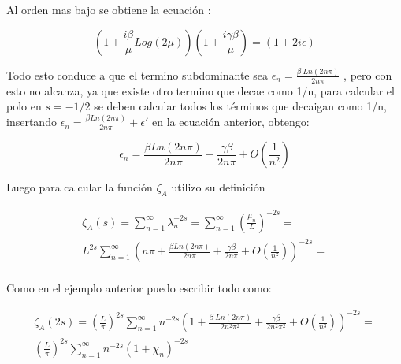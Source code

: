 Al orden mas bajo se obtiene la ecuación : 

\begin{equation}
(1 + \frac{i \beta}{ \mu} Log( 2 \mu) ) 
(1 + \frac{i  \gamma \beta}{ \mu})  =
(1 + 2 i \epsilon)
\end{equation}

Todo esto conduce a que el termino subdominante sea $\epsilon _n =  \frac{\beta \ Ln(2 n \pi)}{2 n \pi}$ , pero con esto no alcanza, ya que existe otro termino que decae como 1/n, para calcular el polo en $s=-1/2$ se deben calcular todos los términos que decaigan como 1/n, insertando $\epsilon _n =  \frac{\beta Ln(2 n \pi)}{2 n \pi} + \epsilon '$ en la ecuación anterior, obtengo:


\begin{equation}
    \epsilon _n =  \frac{\beta Ln(2 n \pi)}{2 n \pi} +
                \frac{\gamma \beta}{2 n \pi} +
                O(\frac{1}{n^2})
\end{equation}

Luego para calcular la función $\zeta _{A}$ utilizo su definición

\begin{equation}
\begin{array}{c}
    \zeta _A (s) = \sum _{n=1} ^{\infty} \lambda _n ^{-2 s}  =
    \sum _{n=1} ^{\infty} \left(\frac{\mu _n}{L} \right) ^{-2 s} =  \\
    L ^{2 s} \sum _{n=1} ^{\infty} 
    \left( 
    n \pi + \frac{\beta Ln(2 n \pi)}{2 n \pi} + \frac{\gamma \beta}{2 n \pi} +
    O(\frac{1}{n^2})
    \right) ^{-2s} = \\
    
\end{array}
\end{equation}

Como en el ejemplo anterior puedo escribir todo como:

\begin{equation}
\begin{array}{c}
    \zeta _A (2 s) = \left( \frac{L}{\pi} \right)  ^{2 s} 
    \sum _{n=1} ^{\infty} n ^{- 2  s}
    \left(
    1 + \frac{\beta \ Ln(2 n \pi)}{2 n^2 \pi ^2} + \frac{\gamma \beta}{2 n^2 \pi ^2 } +
    O \left( \frac{1}{n^3} \right)  \right) ^{-2 s} = \\
    ( \frac{L}{\pi} ) ^{2 s}
    \sum _{n=1} ^{\infty} n ^{-2 s} 
    \left(
    1 + \chi _n \right) ^{- 2 s}
\end{array}
\end{equation}

